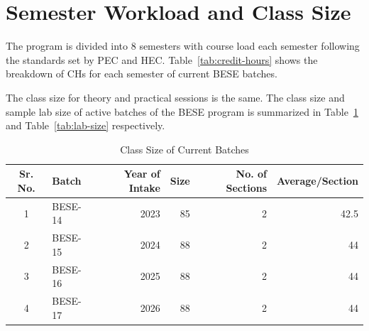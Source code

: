 \section{Semester Workload and Class Size}
\label{sec:class-size}
The program is divided into 8 semesters with course load each semester following the standards set by PEC and HEC. Table~\ref{tab:credit-hours} shows the breakdown of CHs for each semester of current BESE batches.

\begin{table}[H]
\centering
\caption{Credit hours breakdown for each semester for Batch 2k23, 2k24 and 2k25 \& onwards}
\label{tab:credit-hours}
\end{table}
The class size for theory and practical sessions is the same. The class size and sample lab size of active batches of the BESE program is summarized in Table~\ref{tab:class-size} and Table~\ref{tab:lab-size} respectively.

\begin{table}[H]
\centering
\caption{Class Size of Current Batches}
\label{tab:class-size}
\begin{tabular}{@{}clrrrr@{}}
\toprule
\textbf{Sr. No.} & \textbf{Batch} & \textbf{Year of Intake} & \textbf{Size} & \textbf{No. of Sections} & \textbf{Average/Section} \\
\midrule
1 & BESE-14 & 2023 & 85 & 2 & 42.5 \\
2 & BESE-15 & 2024 & 88 & 2 & 44 \\
3 & BESE-16 & 2025 & 88 & 2 & 44 \\
4 & BESE-17 & 2026 & 88 & 2 & 44 \\
\bottomrule
\end{tabular}
\end{table}

